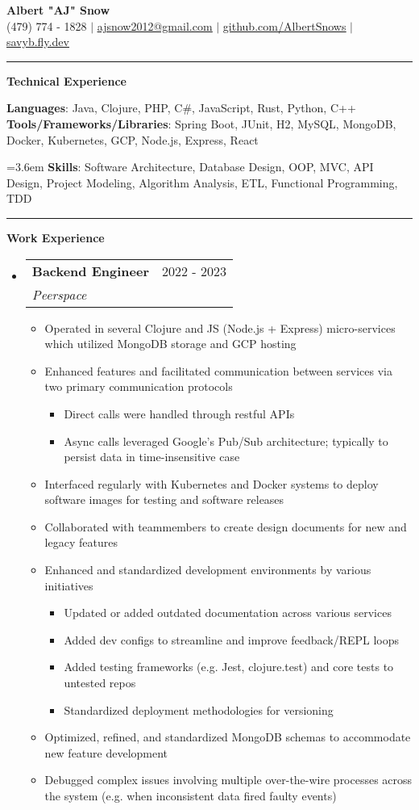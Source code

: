 \documentclass[letterpaper,11pt]{article}
\makeatletter
\newcommand{\resumeItem}[1]{
  \item\small{
    {#1 \vspace{-2pt}}
  }
}
\newcommand{\resumeSubheading}[4]{
  \vspace{-2pt}\item
    \begin{tabular*}{0.97\textwidth}[t]{l@{\extracolsep{\fill}}r}
      \textbf{#1} & #2 \\
      \textit{\small#3} & \textit{\small #4} \\
    \end{tabular*}\vspace{0pt}
}
\newcommand{\resumeSubHeadingListStart}{\begin{itemize}[leftmargin=0.15cm, label={}]}
\newcommand{\resumeSubHeadingListEnd}{\end{itemize}}
\newcommand{\resumeItemListStart}{\begin{itemize}}
\newcommand{\resumeItemListEnd}{\end{itemize}\vspace{-5pt}}
\makeatother
\begin{document}
\textbf{\normalshape \Large \textcolor{magic_blue}{Albert "AJ" Snow}} \\ \vspace{3pt}
\small (479) 774 - 1828 $|$ \href{mailto:ajsnow2012@gmail.com}
{\underline{ajsnow2012@gmail.com}} $|$
\href{https://github.com/AlbertSnows}{\underline{github.com/AlbertSnows}}
$|$ \href{https://savyb.fly.dev/}{\underline{savyb.fly.dev}}
\noindent\rule{19.5cm}{0.4pt}

\textbf{\large \textcolor{magic_blue}{Technical Experience} }

\begin{onehalfspace}
    \textbf{ Languages}{: Java, Clojure, PHP, C\#, JavaScript, Rust, Python, C++ } \\
    \textbf{ Tools/Frameworks/Libraries}{: Spring Boot, JUnit, H2, MySQL, MongoDB, Docker, Kubernetes, GCP, Node.js, Express, React } \\
\end{onehalfspace}
\hangindent=3.6em
\textbf{ Skills}{: }
Software Architecture, Database Design, OOP, MVC, 
API Design, Project Modeling, Algorithm Analysis, 
ETL, Functional Programming, TDD
\noindent\rule{19.5cm}{0.4pt}

\textbf{\large \textcolor{magic_blue}{Work Experience}}
\resumeSubHeadingListStart
\resumeSubheading
{Backend Engineer}{2022 - 2023}
{Peerspace}{}
\resumeItemListStart
\resumeItem{Operated in several Clojure and JS (Node.js + Express) micro-services which utilized MongoDB storage and GCP hosting}
\resumeItem{Enhanced features and facilitated communication between services via two primary communication protocols}
\begin{itemize}
    \item Direct calls were handled through restful APIs
    \item Async calls leveraged Google's Pub/Sub architecture; typically to persist data in time-insensitive case
\end{itemize}
\resumeItem{Interfaced regularly with Kubernetes and Docker systems to deploy software images for testing and software releases}
\resumeItem{Collaborated with teammembers to create design documents for new and legacy features}
\resumeItem{Enhanced and standardized development environments by various initiatives}
\begin{itemize}
    \item Updated or added outdated documentation across various services
    \item Added dev configs to streamline and improve feedback/REPL loops
    \item Added testing frameworks (e.g. Jest, clojure.test) and core tests to untested repos
    \item Standardized deployment methodologies for versioning
\end{itemize}
\resumeItem{Optimized, refined, and standardized MongoDB schemas to accommodate new feature development}
\resumeItem{Debugged complex issues involving multiple over-the-wire processes across the system (e.g. when inconsistent data fired faulty events) }
\resumeItemListEnd
\resumeSubHeadingListEnd
\end{document}

